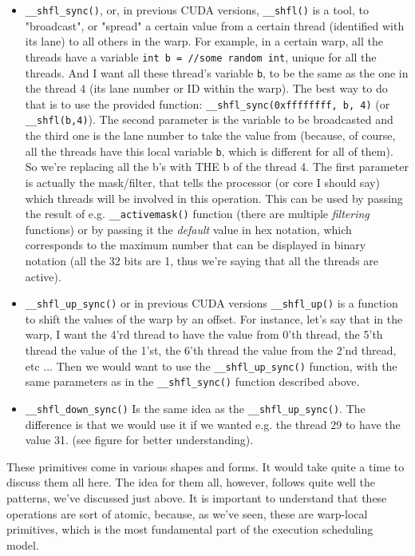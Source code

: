 \begin{itemize}
    \item \verb|__shfl_sync()|, or, in previous CUDA versions, \verb|__shfl()| is a tool, to "broadcast", or "spread"
        a certain value from a certain thread (identified with its lane) to all others in the warp. For example, 
        in a certain warp, all the threads have a variable \verb|int b = //some random int|, unique for all 
        the threads. And I want all these thread's variable \verb|b|, to be the same as the one in the thread 
        4 (its lane number or ID within the warp). The best way to do that is to use the provided function:
        \verb|__shfl_sync(0xffffffff, b, 4)| (or \verb|__shfl(b,4)|). The second parameter is the variable to be 
        broadcasted and the third one is the lane number to take the value from (because, of course, all the 
        threads have this local variable \verb|b|, which is different for all of them). So we're replacing all the 
        b's with THE b of the thread 4. The first parameter is actually the mask/filter, that tells the 
        processor (or core I should say) which threads will be involved in this operation. This can be used 
        by passing the result of e.g. \verb|__activemask()| function (there are multiple \textit{filtering} functions)
        or by passing it the \textit{default} value in hex notation, which corresponds to the maximum number 
        that can be displayed in binary notation (all the 32 bits are 1, thus we're saying that all the threads are active).

    \item \verb|__shfl_up_sync()| or in previous CUDA versions \verb|__shfl_up()| is a function to 
        shift the values of the warp by an offset. For instance, let's say that in the warp, I want 
        the 4'rd thread to have the value from 0'th thread, the 5'th thread the value of the 1'st, the 6'th 
        thread the value from the 2'nd thread, etc ... Then we would want to use the \verb|__shfl_up_sync()| 
        function, with the same parameters as in the \verb|__shfl_sync()| function described above.
    \item \verb|__shfl_down_sync()| Is the same idea as the \verb|__shfl_up_sync()|. The difference is that 
        we would use it if we wanted e.g. the thread 29 to have the value 31. (see figure for better understanding).
\end{itemize}

These primitives come in various shapes and forms. It would take quite a time
to discuss them all here. The idea for them all, however, follows quite well the 
patterns, we've discussed just above. It is important to understand that these operations
are sort of atomic, because, as we've seen, these are warp-local primitives, which is the most 
fundamental part of the execution scheduling model.


